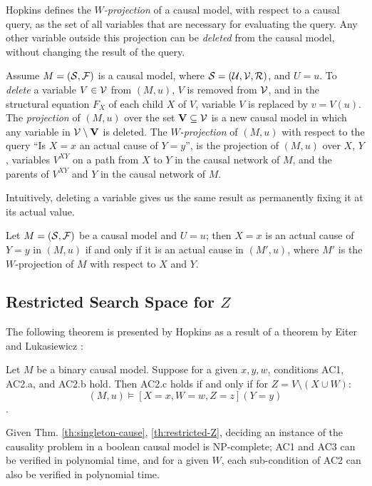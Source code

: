 Hopkins \cite{hopkins2002strategies} defines the \emph{$W$-projection}
of a causal model, with respect to a causal query, as the set of all 
variables that are necessary for evaluating the query. Any other
variable outside this projection can be \emph{deleted} from the causal
model, without changing the result of the query.

\begin{definition}\label{def:variable-deletion}
    Assume $M=(\mathcal{S}, \mathcal{F})$ is a causal model, where 
    $\mathcal{S}=(\mathcal{U}, \mathcal{V}, \mathcal{R})$, and $U=u$. To 
    \emph{delete} a variable $V \in \mathcal{V}$ from $(M,u)$, $V$ is 
    removed from $\mathcal{V}$, and in the structural equation $F_X$ of
    each child $X$ of $V$, variable $V$ is replaced by $v = V(u)$.
    The \emph{projection} of $(M, u)$ over the set
    $\mathbf{V} \subseteq \mathcal{V}$ is a new causal model in which
    any variable in $\mathcal{V} \setminus \mathbf{V}$ is deleted.
    The \emph{$W$-projection} of $(M,u)$ with respect to the query 
    ``Is $X=x$ an actual cause of $Y=y$'', is the projection of $(M,u)$
    over $X$, $Y$, variables $V^{XY}$ on a path from $X$ to $Y$ in
    the causal network of $M$, and the parents of $V^{XY}$ and $Y$ 
    in the causal network of $M$.
\end{definition}

Intuitively, deleting a variable gives us the same result as
permanently fixing it at its actual value.

\begin{theorem}
    Let $M=(\mathcal{S}, \mathcal{F})$ be a causal model and $U=u$; then
    $X=x$ is an actual cause of $Y=y$ in $(M,u)$ if and only if 
    it is an actual cause in $(M',u)$, where $M'$ is the
    $W$-projection of $M$ with respect to $X$ and $Y$.
\end{theorem}


\subsection{\texorpdfstring
    {Restricted Search Space for $Z$}
    {Restricte Search Space for \textit{Z}}
}

The following theorem is presented by Hopkins
\cite{hopkins2002strategies} as a result of a theorem by Eiter and 
Lukasiewicz \cite{eiter2001complexity}:

\begin{theorem}\label{th:restricted-Z}
    Let $M$ be a binary causal model. Suppose for a given $x,y,w$, 
    conditions AC1, AC2.a, and AC2.b hold. Then AC2.c holds if and 
    only if for $Z=V \setminus (X \cup W)$:
    $$ (M, u) \models [X=x, W=w, Z=z] (Y=y) $$. 
\end{theorem}


Given Thm. \ref{th:singleton-cause}, \ref{th:restricted-Z}, deciding 
an instance of the causality problem in a boolean causal model is 
NP-complete; AC1 and AC3 can be verified in polynomial time, and for 
a given $W$, each sub-condition of AC2 can also be verified in 
polynomial time.